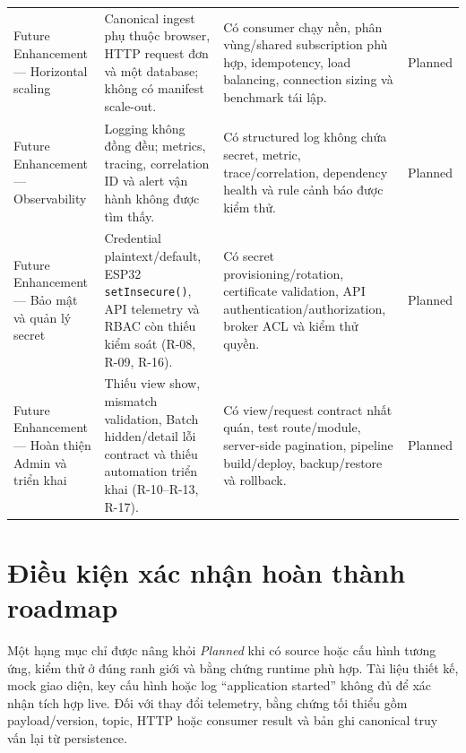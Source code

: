 \begin{longtable}{p{}p{}p{}p{}}
Future Enhancement --- Horizontal scaling & Canonical ingest phụ thuộc browser, HTTP request đơn và một database; không có manifest scale-out. & Có consumer chạy nền, phân vùng/shared subscription phù hợp, idempotency, load balancing, connection sizing và benchmark tái lập. & Planned \\
Future Enhancement --- Observability & Logging không đồng đều; metrics, tracing, correlation ID và alert vận hành không được tìm thấy. & Có structured log không chứa secret, metric, trace/correlation, dependency health và rule cảnh báo được kiểm thử. & Planned \\
Future Enhancement --- Bảo mật và quản lý secret & Credential plaintext/default, ESP32 \texttt{setInsecure()}, API telemetry và RBAC còn thiếu kiểm soát (R-08, R-09, R-16). & Có secret provisioning/rotation, certificate validation, API authentication/authorization, broker ACL và kiểm thử quyền. & Planned \\
Future Enhancement --- Hoàn thiện Admin và triển khai & Thiếu view show, mismatch validation, Batch hidden/detail lỗi contract và thiếu automation triển khai (R-10--R-13, R-17). & Có view/request contract nhất quán, test route/module, server-side pagination, pipeline build/deploy, backup/restore và rollback. & Planned \\
\hline
\end{longtable}
\endgroup

\section{Điều kiện xác nhận hoàn thành roadmap}

Một hạng mục chỉ được nâng khỏi \textit{Planned} khi có source hoặc cấu hình tương ứng,
kiểm thử ở đúng ranh giới và bằng chứng runtime phù hợp. Tài liệu thiết kế, mock giao diện,
key cấu hình hoặc log ``application started'' không đủ để xác nhận tích hợp live. Đối với
thay đổi telemetry, bằng chứng tối thiểu gồm payload/version, topic, HTTP hoặc consumer
result và bản ghi canonical truy vấn lại từ persistence.
